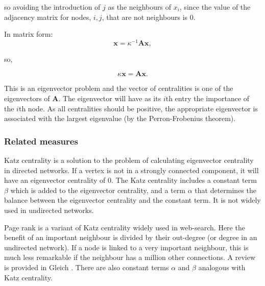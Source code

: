 so avoiding the introduction of $j$ as the neighbours of $x_i$, since the value of the adjacency matrix for nodes, $i,j$, that are not neighbours is 0.

In matrix form:
\begin{equation}
    \mathbf{x}=\kappa^{-1}\mathbf{Ax},
    \end{equation}
    
    so,
    
    \begin{equation}
         \kappa\mathbf{x}=\mathbf{Ax}.
    \end{equation}
  
  
  
  
This is an eigenvector problem and the vector of centralities is one of the eigenvectors of $\mathbf{A}$. The eigenvector will have as its $i$th entry the importance of the $i$th node. As all centralities should be positive, the appropriate eigenvector is associated with the largest eigenvalue (by the Perron-Frobenius theorem). 
  
 \subsubsection{Related measures}
\label{sec:related centrality measures}
Katz centrality is a solution to the problem of calculating eigenvector centrality in directed networks. If a vertex is not in a strongly connected component, it will have an eigenvector centrality of 0. The Katz centrality includes a constant term $\beta$ which is added to the eigenvector centrality, and a term $\alpha$ that determines the balance between the eigenvector centrality and the constant term. It is not widely used in undirected networks\cite{newman2018networks}. 

Page rank is a variant of Katz centrality widely used in web-search. Here the benefit of an important neighbour is divided by their out-degree (or degree in an undirected network). If a node is linked to a very important neighbour, this is much less remarkable if the neighbour has a million other connections. A review is provided in Gleich \cite{gleich2015pagerank}. There are also constant terms $\alpha$ and $\beta$ analogous with Katz centrality\cite{newman2018networks}.
    
 

